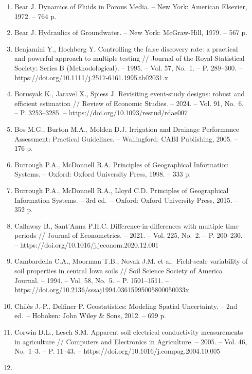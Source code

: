 \begin{enumerate}
  and Drainage Paper 29 (Rev.~1). -- Rome: FAO, 1985. -- 174 p.
\item
  Bear J. Dynamics of Fluids in Porous Media. -- New York: American
  Elsevier, 1972. -- 764 p.
\item
  Bear J. Hydraulics of Groundwater. -- New York: McGraw-Hill, 1979. --
  567 p.
\item
  Benjamini Y., Hochberg Y. Controlling the false discovery rate: a
  practical and powerful approach to multiple testing // Journal of the
  Royal Statistical Society: Series B (Methodological). -- 1995. -- Vol.
  57, No.~1. -- P. 289--300. --
  https://doi.org/10.1111/j.2517-6161.1995.tb02031.x
\item
  Borusyak K., Jaravel X., Spiess J. Revisiting event-study designs:
  robust and efficient estimation // Review of Economic Studies. --
  2024. -- Vol. 91, No.~6. -- P. 3253--3285. --
  https://doi.org/10.1093/restud/rdae007
\item
  Bos M.G., Burton M.A., Molden D.J. Irrigation and Drainage Performance
  Assessment: Practical Guidelines. -- Wallingford: CABI Publishing,
  2005. -- 176 p.
\item
  Burrough P.A., McDonnell R.A. Principles of Geographical Information
  Systems. -- Oxford: Oxford University Press, 1998. -- 333 p.
\item
  Burrough P.A., McDonnell R.A., Lloyd C.D. Principles of Geographical
  Information Systems. -- 3rd ed.~-- Oxford: Oxford University Press,
  2015. -- 352 p.
\item
  Callaway B., Sant'Anna P.H.C. Difference-in-differences with multiple
  time periods // Journal of Econometrics. -- 2021. -- Vol. 225, No.~2.
  -- P. 200--230. -- https://doi.org/10.1016/j.jeconom.2020.12.001
\item
  Cambardella C.A., Moorman T.B., Novak J.M. et al.~Field-scale
  variability of soil properties in central Iowa soils // Soil Science
  Society of America Journal. -- 1994. -- Vol. 58, No.~5. -- P.
  1501--1511. -- https://doi.org/10.2136/sssaj1994.03615995005800050033x
\item
  Chilès J.-P., Delfiner P. Geostatistics: Modeling Spatial Uncertainty.
  -- 2nd ed.~-- Hoboken: John Wiley \& Sons, 2012. -- 699 p.
\item
  Corwin D.L., Lesch S.M. Apparent soil electrical conductivity
  measurements in agriculture // Computers and Electronics in
  Agriculture. -- 2005. -- Vol. 46, No.~1--3. -- P. 11--43. --
  https://doi.org/10.1016/j.compag.2004.10.005
\item

\end{enumerate}
